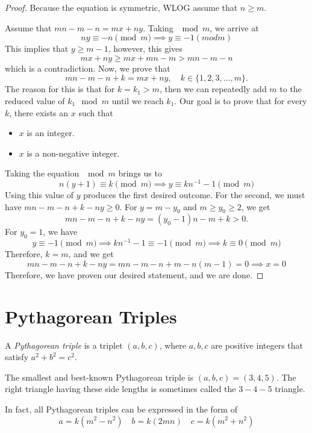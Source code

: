 \begin{proof}
Because the equation is symmetric, WLOG assume that $n\ge m$.

Assume that $mn-m-n=mx+ny$. Taking $\mod m$, we arrive at
\[ny\equiv-n\pmod m \implies y\equiv-1 (mod m)\]
This implies that $y\ge m-1$, however, this gives
\[mx+ny\ge mx+mn-m>mn-m-n\]
which is a contradiction. Now, we prove that
\[mn-m-n+k=mx+ny, \quad k\in\{1,2,3,\dots,m\}.\]
The reason for this is that for $k=k_1>m$, then we can repeatedly add $m$ to the reduced value of $k_1 \mod m$ until we reach $k_1$. Our goal is to prove that for every $k$, there exists an $x$ such that
\begin{itemize}
\item $x$ is an integer.
\item $x$ is a non-negative integer.
\end{itemize}

Taking the equation $\mod m$ brings us to 
\[n(y+1)\equiv k\pmod m \implies y\equiv kn^{-1}-1\pmod m\]
Using this value of $y$ produces the first desired outcome. For the second, we must have $mn-m-n+k-ny\ge0$. For $y=m-y_0$ and $m\ge y_0\ge 2$, we get
\[mn-m-n+k-ny=(y_0-1)n-m+k>0.\]
For $y_0=1$, we have
\[y\equiv-1\pmod m \implies kn^{-1}-1\equiv-1\pmod m \implies k\equiv0\pmod m\]
Therefore, $k=m$, and we get
\[mn-m-n+k-ny=mn-m-n+m-n(m-1)=0 \implies x=0\]
Therefore, we have proven our desired statement, and we are done.
\end{proof}
\pagebreak

\section{Pythagorean Triples}
\begin{definition}
A \emph{Pythagorean triple} is a triplet $(a,b,c)$, where $a,b,c$ are positive integers that satisfy $a^2+b^2=c^2$.
\end{definition}

The smallest and best-known Pythagorean triple is $(a,b,c)=(3,4,5)$. The right triangle having these side lengths is sometimes called the $3-4-5$ triangle.

In fact, all Pythagorean triples can be expressed in the form of 
\[a=k(m^2-n^2) \quad b=k(2mn) \quad c=k(m^2+n^2)\]

